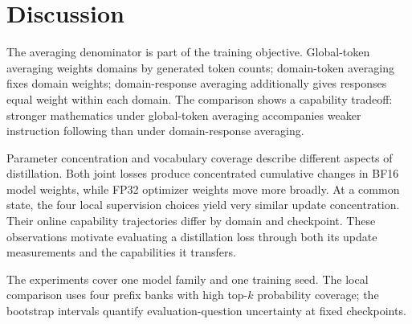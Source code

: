 \section{Discussion}

The averaging denominator is part of the training objective. Global-token averaging weights domains by generated token counts; domain-token averaging fixes domain weights; domain-response averaging additionally gives responses equal weight within each domain. The comparison shows a capability tradeoff: stronger mathematics under global-token averaging accompanies weaker instruction following than under domain-response averaging.

Parameter concentration and vocabulary coverage describe different aspects of distillation. Both joint losses produce concentrated cumulative changes in BF16 model weights, while FP32 optimizer weights move more broadly. At a common state, the four local supervision choices yield very similar update concentration. Their online capability trajectories differ by domain and checkpoint. These observations motivate evaluating a distillation loss through both its update measurements and the capabilities it transfers.

The experiments cover one model family and one training seed. The local comparison uses four prefix banks with high top-$k$ probability coverage; the bootstrap intervals quantify evaluation-question uncertainty at fixed checkpoints.
